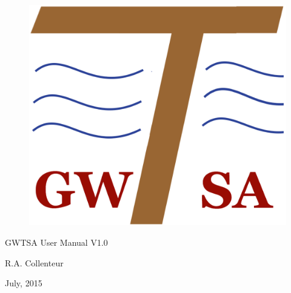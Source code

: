 \begin{titlepage}

\vspace*{40pt}

\begin{figure}
	\centering
	\includegraphics[width=0.4\linewidth]{./Figures/Logo}
\end{figure}


\begin{center}
	
{\huge GWTSA User Manual V1.0}

\bigskip
{\Large R.A. Collenteur}

\bigskip

{\large July, 2015}

\end{center}


\vspace*{\fill}

\end{titlepage}